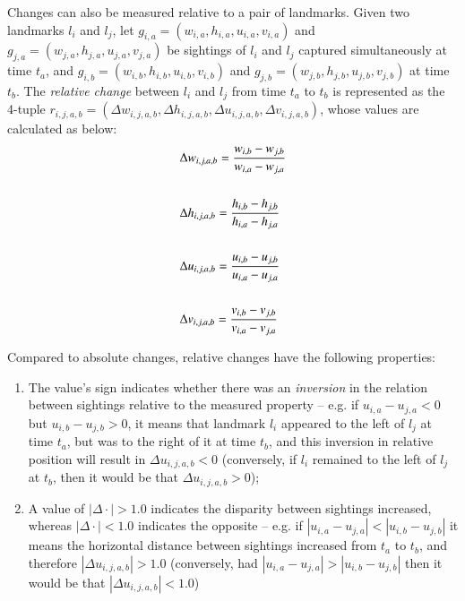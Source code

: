 \documentclass[twocolumn, 9pt]{jsproceedings}
\begin{document}
Changes can also be measured relative to a pair of landmarks. Given two landmarks \(l_i\) and \(l_j\), let \(g_{i,a} = (w_{i,a}, h_{i,a}, u_{i,a}, v_{i,a})\) and \(g_{j,a} = (w_{j,a}, h_{j,a}, u_{j,a}, v_{j,a})\) be sightings of \(l_i\) and \(l_j\) captured simultaneously at time \(t_a\), and \(g_{i,b} = (w_{i,b}, h_{i,b}, u_{i,b}, v_{i,b})\) and \(g_{j,b} = (w_{j,b}, h_{j,b}, u_{j,b}, v_{j,b})\) at time \(t_b\). The {\it relative change} between \(l_i\) and \(l_j\) from time \(t_a\) to \(t_b\) is represented as the 4-tuple \(r_{i,j,a,b} = (\Delta w_{i,j,a,b}, \Delta h_{i,j,a,b}, \Delta u_{i,j,a,b}, \Delta v_{i,j,a,b})\), whose values are calculated as below:
\begin{align}
& \Delta w_{i,j,a,b} = \frac{w_{i,b} - w_{j,b}}{w_{i,a} - w_{j,a}} \\
 \notag\\
& \Delta h_{i,j,a,b} = \frac{h_{i,b} - h_{j,b}}{h_{i,a} - h_{j,a}} \\
 \notag\\
& \Delta u_{i,j,a,b} = \frac{u_{i,b} - u_{j,b}}{u_{i,a} - u_{j,a}} \\
 \notag\\
& \Delta v_{i,j,a,b} = \frac{v_{i,b} - v_{j,b}}{v_{i,a} - v_{j,a}}
\end{align}

Compared to absolute changes, relative changes have the following properties:

\begin{enumerate}
\item The value's sign indicates whether there was an {\it inversion} in the relation between sightings relative to the measured property -- e.g. if \(u_{i,a} - u_{j,a} < 0\) but \(u_{i,b} - u_{j,b} > 0\), it means that landmark \(l_i\) appeared to the left of \(l_j\) at time \(t_a\), but was to the right of it at time \(t_b\), and this inversion in relative position will result in \(\Delta u_{i,j,a,b} < 0\) (conversely, if \(l_i\) remained to the left of \(l_j\) at \(t_b\), then it would be that \(\Delta u_{i,j,a,b} > 0\));
\item A value of \(|\Delta \cdot| > 1.0\) indicates the disparity between sightings increased, whereas \(|\Delta \cdot| < 1.0\) indicates the opposite -- e.g. if \(|u_{i,a} - u_{j,a}| < |u_{i,b} - u_{j,b}|\) it means the horizontal distance between sightings increased from \(t_a\) to  \(t_b\), and therefore \(|\Delta u_{i,j,a,b}| > 1.0\) (conversely, had \(|u_{i,a} - u_{j,a}| > |u_{i,b} - u_{j,b}|\) then it would be that \(|\Delta u_{i,j,a,b}| < 1.0\))
\end{enumerate}
\end{document}
